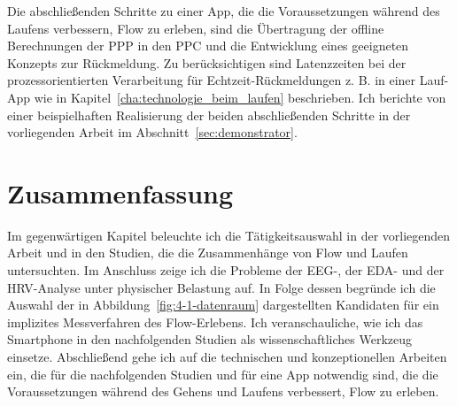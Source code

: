 Die abschließenden Schritte zu einer App, die die Voraussetzungen während des Laufens verbessern, Flow zu erleben, sind die Übertragung der offline Berechnungen der \ac{PPP} in den \ac{PPC} und die Entwicklung eines geeigneten Konzepts zur Rückmeldung. Zu berücksichtigen sind Latenzzeiten bei der prozessorientierten Verarbeitung für Echtzeit-Rückmeldungen z. B. in einer Lauf-App wie in Kapitel~\ref{cha:technologie_beim_laufen} beschrieben. Ich berichte von einer beispielhaften Realisierung der beiden abschließenden Schritte in der vorliegenden Arbeit im Abschnitt~\ref{sec:demonstrator}.

\section{Zusammenfassung}
\label{sec:zusammenfassung-4}
Im gegenwärtigen Kapitel beleuchte ich die Tätigkeitsauswahl in der vorliegenden Arbeit und in den Studien, die die Zusammenhänge von Flow und Laufen untersuchten. Im Anschluss zeige ich die Probleme der \ac{EEG}-, der \ac{EDA}- und der \ac{HRV}-Analyse unter physischer Belastung auf. In Folge dessen begründe ich die Auswahl der in Abbildung~\ref{fig:4-1-datenraum} dargestellten Kandidaten für ein implizites Messverfahren des Flow-Erlebens. Ich veranschauliche, wie ich das Smartphone in den nachfolgenden Studien als wissenschaftliches Werkzeug einsetze. Abschließend gehe ich auf die technischen und konzeptionellen Arbeiten ein, die für die nachfolgenden Studien und für eine App notwendig sind, die die Voraussetzungen während des Gehens und Laufens verbessert, Flow zu erleben.